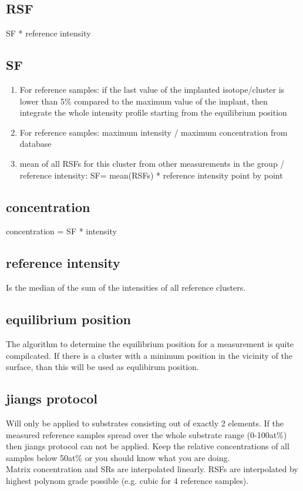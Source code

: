 \documentclass[a4paper,10pt]{article}
\begin{document}
\subsection{RSF}
SF * reference intensity

\subsection{SF}
\begin{enumerate}
 \item For reference samples: if the last value of the implanted isotope/cluster is lower than 5\% compared to the maximum value of the implant, then integrate the whole intensity profile starting from the equilibrium position
 \item For reference samples: maximum intensity / maximum concentration from database
 \item mean of all RSFs for this cluster from other measurements in the group / reference intensity: SF= mean(RSFs) * reference intensity point by point
\end{enumerate}

\subsection{concentration}
concentration = SF * intensity


\subsection{reference intensity}
Is the median of the sum of the intensities of all reference clusters.

\subsection{equilibrium position}
The algorithm to determine the equilibrium position for a measurement is quite compilcated. If there is a cluster with a minimum position in the vicinity of the surface, than this will be used as equlibirum position.

\subsection{jiangs protocol}
Will only be applied to substrates consisting out of exactly 2 elements. If the measured reference samples spread over the whole substrate range (0-100at\%) then jiangs protocol can not be applied. Keep the relative concentrations of all samples below 50at\% or you should know what you are doing.\\
Matrix concentration and SRs are interpolated linearly. RSFs are interpolated by highest polynom grade possible (e.g. cubic for 4 reference samples).
\end{document}
